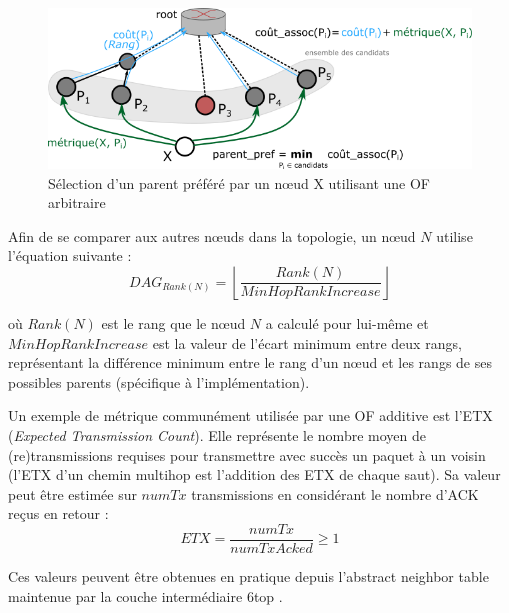 \documentclass[]{report}
\newcommand{\floor}[1]{\left\lfloor #1 \right\rfloor}
\begin{document}
	\begin{figure}[!h]
	\centering
	\includegraphics[width=0.85\linewidth]{OF_sel_parent}
	\caption{Sélection d'un parent préféré par un nœud X utilisant une OF arbitraire}
	\label{fig:OF}
	\end{figure}

\vspace{0.3cm}

Afin de se comparer aux autres nœuds dans la topologie, un nœud $N$ utilise l'équation suivante :
\[
DAG_{Rank(N)} = \floor{\frac{Rank(N)}{MinHopRankIncrease}}
\]

\noindent où $Rank(N)$ est le rang que le nœud $N$ a calculé pour lui-même et $MinHopRankIncrease$ est la valeur de l'écart minimum entre deux rangs, représentant la différence minimum entre le rang d'un nœud et les rangs de ses possibles parents (spécifique à l'implémentation).

\newpage

\par Un exemple de métrique communément utilisée par une OF additive est l'ETX (\textit{Expected Transmission Count}). Elle représente le nombre moyen de (re)transmissions requises pour transmettre avec succès un paquet à un voisin (l'ETX d'un chemin multihop est l'addition des ETX de chaque saut). Sa valeur peut être estimée sur $numTx$ transmissions en considérant le nombre d'ACK reçus en retour : 
\begin{equation}
ETX = \frac{numTx}{numTxAcked} \geq 1
\end{equation}

\noindent Ces valeurs peuvent être obtenues en pratique depuis l'abstract neighbor table maintenue par la couche intermédiaire 6top \cite{ietf-6tisch-architecture-28}.
\end{document}
